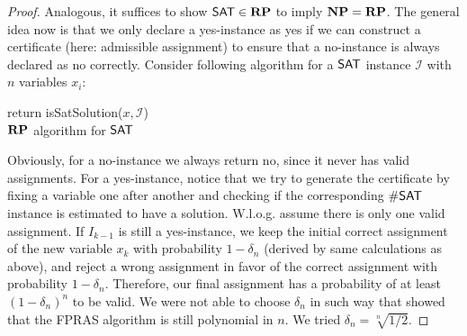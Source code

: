 \begin{aufgabe}
\begin{proof}
    Analogous, it suffices to show $\mathsf{SAT} \in \mathbf{RP}$ to imply $\mathbf{NP} = \mathbf{RP}$. The general idea now is that we only declare a yes-instance as yes if we can construct a certificate (here: admissible assignment) to ensure that a no-instance is always declared as no correctly.
    Consider following algorithm for a $\mathsf{SAT}$ instance $\mathcal I$ with $n$ variables $x_i$:
    \newline
    \begin{algorithm}[H]
        \label{algo:sat_is_rp}
        \SetAlgoLined
        return isSatSolution($x, \mathcal I$)\\
        \caption{$\mathbf{RP}$ algorithm for $\mathsf{SAT}$}
    \end{algorithm}
    
    Obviously, for a no-instance we always return no, since it never has valid assignments.
    For a yes-instance, notice that we try to generate the certificate by fixing a variable one after another and checking if the corresponding $\mathsf{\#SAT}$ instance is estimated to have a solution.
    W.l.o.g. assume there is only one valid assignment.
    If $I_{k-1}$ is still a yes-instance, we keep the initial correct assignment of the new variable $x_k$ with probability $1- \delta_n$ (derived by same calculations as above), and reject a wrong assignment in favor of the correct assignment with probability $1 - \delta_n$.
    Therefore, our final assignment has a probability of at least $(1 - \delta_n)^n$ to be valid.
    We were not able to choose $\delta_n$ in such way that showed that the FPRAS algorithm is still polynomial in $n$.
    We tried $\delta_n = \sqrt[n]{1/2}$.

 \end{proof}
\end{aufgabe}
